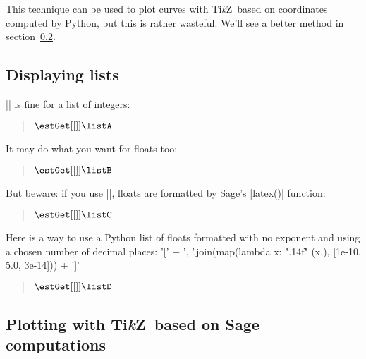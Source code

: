 \documentclass{article}
\newcommand*{\tikzname}{Ti\emph{k}Z}
\begin{document}
This technique can be used to plot curves with \tikzname\ based on coordinates
computed by Python, but this is rather wasteful. We'll see a better method
in section~\ref{sec:plotting-with-tikzname-based-on-Sage-computations}.

\subsection{Displaying lists}
\label{sec:lists}

|\estRecordFormatted| is fine for a list of integers:%
%
\begin{quote}
  \estRefUsed{\listA}%
  $\estGet[{[]}]{\listA}$
\end{quote}

It may do what you want for floats too:
%
\begin{quote}
  \estRefUsed{\listB}%
  $\estGet[{[]}]{\listB}$
\end{quote}

But beware: if you use |\estRecordFormatted|, floats are formatted by Sage's
|latex()| function:
\estRecordFormatted{\listC}{[1e-10] + [5.0, 3e-14]}
\begin{quote}
  \small
  \estRefUsed{\listC}%
  $\estGet[{[]}]{\listC}$
\end{quote}

Here is a way to use a Python list of floats formatted with no exponent
and using a chosen number of decimal places:%
\estRecordStr{\listD}
  {
    '[' +
    ', '.join(map(lambda x: "\percent.14f" \percent (x,), [1e-10, 5.0, 3e-14])) +
    ']'
  }
\begin{quote}
  \estRefUsed{\listD}%
  $\estGet[{[]}]{\listD}$
\end{quote}

\subsection{Plotting with \tikzname\ based on Sage computations}
\label{sec:plotting-with-tikzname-based-on-Sage-computations}
\end{document}
